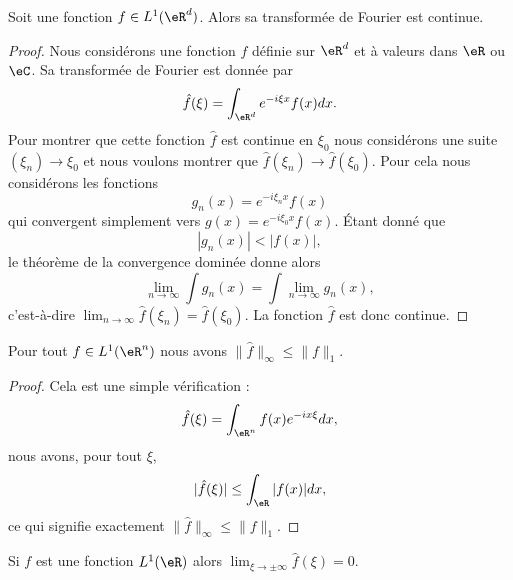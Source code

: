 \begin{proposition}       \label{PropJvNfj}
	Soit une fonction \( f\in L^1(\eR^d)\). Alors sa transformée de Fourier est continue.
\end{proposition}

\begin{proof}
	Nous considérons une fonction \( f\) définie sur \( \eR^d\) et à valeurs dans \( \eR\) ou \( \eC\). Sa transformée de Fourier est donnée par
	\begin{equation}
		\hat f(\xi)=\int_{\eR^d} e^{-i\xi x}f(x)dx.
	\end{equation}
	Pour montrer que cette fonction \( \hat f\) est continue en \( \xi_0\) nous considérons une suite \( (\xi_n)\to \xi_0\) et nous voulons montrer que \( \hat f(\xi_n)\to\hat f(\xi_0)\). Pour cela nous considérons les fonctions
	\begin{equation}
		g_n(x)= e^{-i\xi_nx}f(x)
	\end{equation}
	qui convergent simplement vers \( g(x)= e^{-i\xi_0 x}f(x)\). Étant donné que
	\begin{equation}
		| g_n(x) |<| f(x) |,
	\end{equation}
	le théorème de la convergence dominée donne alors
	\begin{equation}
		\lim_{n\to \infty} \int g_n(x)=\int\lim_{n\to \infty } g_n(x),
	\end{equation}
	c'est-à-dire \( \lim_{n\to \infty} \hat f(\xi_n)=\hat f(\xi_0)\). La fonction \( \hat f\) est donc continue.
\end{proof}

\begin{lemma}       \label{LEMooCBPTooYlcbrR}
	Pour tout \( f\in L^1(\eR^n)\) nous avons \( \| \hat f \|_{\infty}\leq \| f \|_1\).
\end{lemma}

\begin{proof}
	Cela est une simple vérification :
	\begin{equation}
		\hat f(\xi)=\int_{\eR^n}f(x) e^{-ix\xi}dx,
	\end{equation}
	nous avons, pour tout \( \xi\),
	\begin{equation}
		| \hat f(\xi) |\leq\int_{\eR}| f(x) |dx,
	\end{equation}
	ce qui signifie exactement \( \| \hat f \|_{\infty}\leq \| f \|_1\).
\end{proof}

\begin{lemma}     \label{LesmRLaxXkQV}
	Si \( f\) est une fonction \( L^1(\eR)\) alors \( \lim_{\xi\to\pm\infty} \hat f(\xi)=0\).
\end{lemma}

